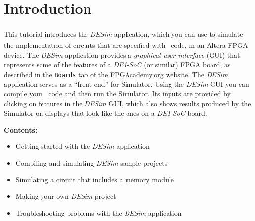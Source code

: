 \thispagestyle{plain}
 
\section{Introduction}

This tutorial introduces the {\it DESim}\textsuperscript{\textregistered} application, 
which you can use to simulate the implementation of circuits that are specified 
with \hdlName~code, in an Altera\textsuperscript{\textregistered} FPGA device. 
The {\it DESim} application provides a {\it graphical user interface} 
(GUI) that represents some of the features of a {\it DE1-SoC} (or similar) FPGA board, 
as described in the \texttt{Boards} tab of the 
{\small \href{https://www.fpgacademy.org/boards.html} {FPGAcademy.org}} website.
The {\it DESim} application serves as a ``front end'' for 
 \fi
Simulator. Using the {\it DESim} GUI you can compile your
\hdlName~code and then run the Simulator. Its inputs are provided by 
clicking on features in the {\it DESim} GUI, which also shows results produced by 
the Simulator on displays that look like the ones on a {\it DE1-SoC} board.

{\bf Contents:}
\vspace{-1em}
\begin{itemize}
\item Getting started with the {\it DESim} application
\item Compiling and simulating {\it DESim} sample projects
\item Simulating a circuit that includes a memory module
\item Making your own {\it DESim} project
\item Troubleshooting problems with the {\it DESim} application
\end{itemize}

